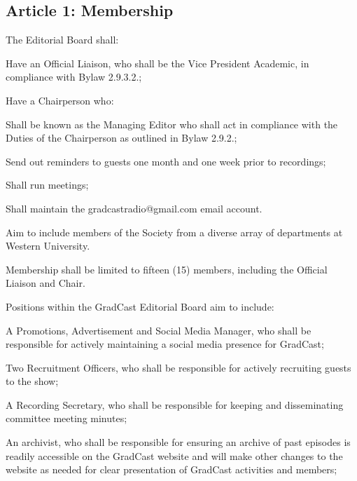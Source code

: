 \subsection{Article 1: Membership} 
\begin{longenum}[ label*=\thesubsection.\arabic*., align=left] 	
\item The Editorial Board shall: 
	\begin{longenum}[label*=\arabic*., align=left]	
	\item Have an Official Liaison, who shall be the Vice President Academic, in compliance with Bylaw 2.9.3.2.;
	\item Have a Chairperson who:
		\begin{longenum}[label*=\arabic*., align=left]	
		\item Shall be known as the Managing Editor who shall act in compliance with the Duties of the Chairperson as outlined in Bylaw 2.9.2.;
		\item Send out reminders to guests one month and one week prior to recordings;
		\item Shall run meetings;
		\item Shall maintain the gradcastradio@gmail.com email account.
		\end{longenum}
	\item Aim to include members of the Society from a diverse array of departments at Western University.
	\end{longenum}
\item Membership shall be limited to fifteen (15) members, including the Official Liaison and Chair.
\item Positions within the GradCast Editorial Board aim to include:
	\begin{longenum}[label*=\arabic*., align=left]	
	\item A Promotions, Advertisement and Social Media Manager, who shall be responsible for actively maintaining a social media presence for GradCast;
	\item Two Recruitment Officers, who shall be responsible for actively recruiting guests to the show; 
	\item A Recording Secretary, who shall be responsible for keeping and disseminating committee meeting minutes;
	\item An archivist, who shall be responsible for ensuring an archive of past episodes is readily accessible on the GradCast website and will make other changes to the website as needed for clear presentation of GradCast activities and members;

\end{longenum}
\end{longenum}
